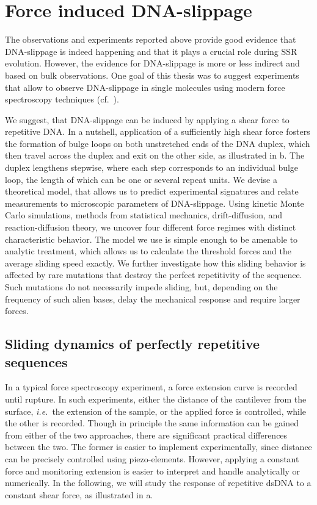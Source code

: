 \section{Force induced DNA-slippage}
The observations and experiments reported above provide good evidence that DNA-slippage
is indeed happening and that it plays a crucial role during SSR evolution.  
However, the evidence for DNA-slippage is more or less indirect and based on bulk 
observations. One goal of this thesis was to suggest experiments that allow to observe 
DNA-slippage in single molecules using modern force spectroscopy techniques (cf.~). 

We suggest, that  DNA-slippage can be induced by applying a shear force to 
repetitive DNA.  In a nutshell, application of a sufficiently high shear force fosters the 
formation of bulge loops on both unstretched ends of the DNA duplex, which then travel 
across the duplex and exit on the other side, as illustrated in b. The duplex lengthens stepwise, 
where each step corresponds to an individual bulge loop,
the length of which can be one or several repeat units. We devise a theoretical model, that allows us
to predict experimental signatures and relate measurements to microscopic parameters of DNA-slippage.
Using kinetic Monte Carlo simulations, methods from statistical mechanics,
drift-diffusion, and reaction-diffusion theory, we uncover four different force regimes with
distinct characteristic behavior.
The model we use is simple enough to be amenable to analytic treatment, which
allows us to calculate the threshold forces and the average sliding speed exactly. 
We further investigate how this sliding behavior is affected by rare mutations that destroy
the perfect repetitivity of the sequence. Such mutations do not necessarily impede sliding,
but, depending on the frequency of such alien bases, delay the mechanical
response and require larger forces. 


\subsection{Sliding dynamics of perfectly repetitive sequences}
In a typical force spectroscopy experiment, a force extension curve is recorded
until rupture. In such experiments, either the distance of the cantilever from the surface,
\emph{i.e.}~the extension of the sample, or the applied force is controlled, while the other is recorded.
Though in principle the same information can be gained from either of the two approaches,
there are significant practical differences between the two. 
The former is easier to implement experimentally, since distance can be precisely controlled
using piezo-elements. However, applying a constant force and monitoring extension is easier to interpret and handle analytically or numerically. In the following, we will study the response of repetitive dsDNA
to a constant shear force, as illustrated in a.

